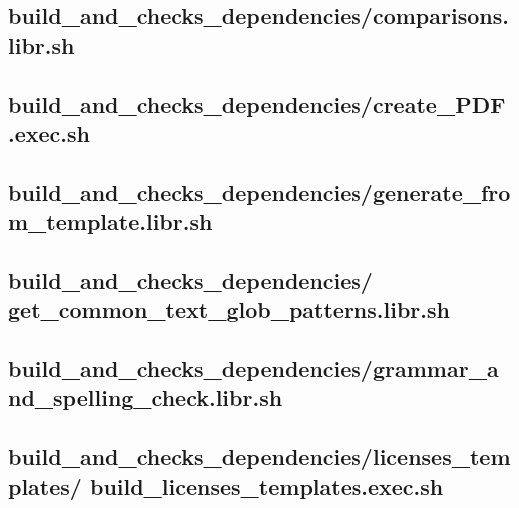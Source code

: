 \documentclass{article}
\begin{document}
\subsection{
  build\_and\_checks\_dependencies/comparisons.libr.sh
}
\label{
  build_and_checks_dependencies:comparisonslibrsh
}



\subsection{
  build\_and\_checks\_dependencies/create\_PDF.exec.sh
}
\label{
  build_and_checks_dependencies:create_PDFexecsh
}



\subsection{
  build\_and\_checks\_dependencies/generate\_from\_template.libr.sh
}
\label{
  build_and_checks_dependencies:generate_from_templatelibrsh
}



\subsection{
  build\_and\_checks\_dependencies/%
get\_common\_text\_glob\_patterns.libr.sh
}
\label{
  build_and_checks_dependencies:get_common_text_glob_patternslibrsh
}



\subsection{
  build\_and\_checks\_dependencies/grammar\_and\_spelling\_check.libr.sh
}
\label{
  build_and_checks_dependencies:grammar_and_spelling_checklibrsh
}



\subsection{
  build\_and\_checks\_dependencies/licenses\_templates/%
build\_licenses\_templates.exec.sh
}
\label{
  build_and_checks_dependencies:licenses_templates:%
build_licenses_templatesexecsh
}
\end{document}
